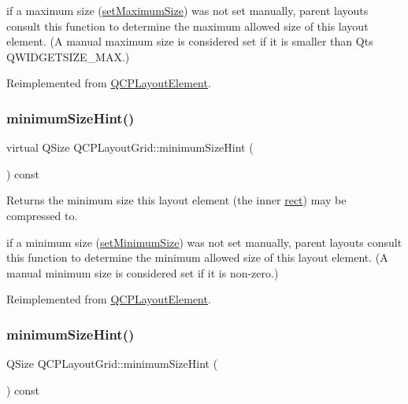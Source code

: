 if a maximum size (\hyperlink{class_q_c_p_layout_element_a74eb5280a737ab44833d506db65efd95}{set\+Maximum\+Size}) was not set manually, parent layouts consult this function to determine the maximum allowed size of this layout element. (A manual maximum size is considered set if it is smaller than Qt\textquotesingle{}s Q\+W\+I\+D\+G\+E\+T\+S\+I\+Z\+E\+\_\+\+M\+AX.) 

Reimplemented from \hyperlink{class_q_c_p_layout_element_ab5ce2ba22b36d9a3b70a1be562c326e5}{Q\+C\+P\+Layout\+Element}.

\mbox{\label{class_q_c_p_layout_grid_a57515592661621cc07d027867bcfc4de}} 
\subsubsection{\texorpdfstring{minimum\+Size\+Hint()}{minimumSizeHint()}\hspace{0.1cm}{\footnotesize\ttfamily [1/2]}}
{\footnotesize\ttfamily virtual Q\+Size Q\+C\+P\+Layout\+Grid\+::minimum\+Size\+Hint (\begin{DoxyParamCaption}{ }\end{DoxyParamCaption}) const\hspace{0.3cm}{\ttfamily [virtual]}}

Returns the minimum size this layout element (the inner \hyperlink{class_q_c_p_layout_element_a208effccfe2cca4a0eaf9393e60f2dd4}{rect}) may be compressed to.

if a minimum size (\hyperlink{class_q_c_p_layout_element_a5dd29a3c8bc88440c97c06b67be7886b}{set\+Minimum\+Size}) was not set manually, parent layouts consult this function to determine the minimum allowed size of this layout element. (A manual minimum size is considered set if it is non-\/zero.) 

Reimplemented from \hyperlink{class_q_c_p_layout_element_ab3fdb5c9a5189bb2dac10d4d25329cd8}{Q\+C\+P\+Layout\+Element}.

\mbox{\label{class_q_c_p_layout_grid_a361c3f5906c21a6709cb8daf5a9e019f}} 
\subsubsection{\texorpdfstring{minimum\+Size\+Hint()}{minimumSizeHint()}\hspace{0.1cm}{\footnotesize\ttfamily [2/2]}}
{\footnotesize\ttfamily Q\+Size Q\+C\+P\+Layout\+Grid\+::minimum\+Size\+Hint (\begin{DoxyParamCaption}{ }\end{DoxyParamCaption}) const\hspace{0.3cm}{\ttfamily [virtual]}}


